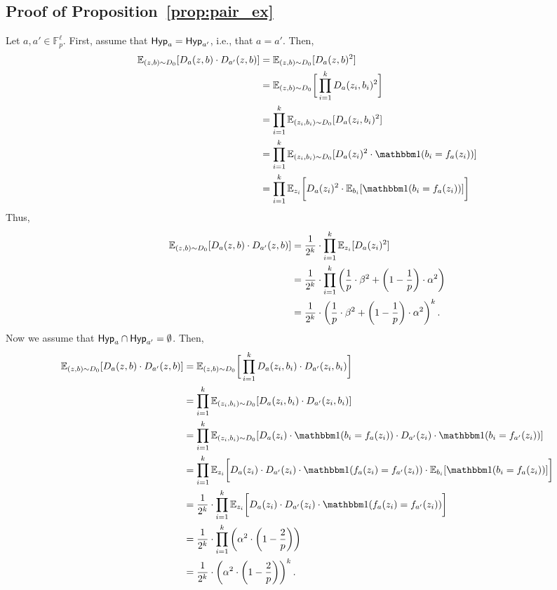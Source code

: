 \subsection{Proof of Proposition~\ref{prop:pair_ex}}

	Let $a, a' \in \mathbb{F}_p^{\ell}$. First, assume that $\mathsf{Hyp}_a = \mathsf{Hyp}_{a'}$, i.e., that $a = a'$. Then,
	\begin{align*}
	\Ex_{(z,b) \sim D_0}[D_a(z,b) \cdot D_{a'}(z,b)] &= \Ex_{(z,b) \sim D_0}[D_a(z,b)^2]\\
	&= \Ex_{(z,b) \sim D_0}\bigg[\displaystyle\prod\limits_{i = 1}^k D_a(z_i,b_i)^2 \bigg]\\
	&= \displaystyle\prod\limits_{i = 1}^k \Ex_{(z_i,b_i) \sim D_0} [D_a(z_i,b_i)^2]\\
	&= \displaystyle\prod\limits_{i = 1}^k \Ex_{(z_i,b_i) \sim D_0} [D_a(z_i)^2 \cdot \ind(b_i = f_a(z_i))]\\
	&= \displaystyle\prod\limits_{i = 1}^k \Ex_{z_i}\bigg[D_a(z_i)^2 \cdot \Ex_{b_i}[\ind(b_i = f_a(z_i))] \bigg]
	\end{align*}
	Thus,
	\begin{align*}
	\mathbb E_{(z,b) \sim D_0}[D_a(z,b) \cdot D_{a'}(z,b)] &= \frac{1}{2^k} \cdot \displaystyle\prod\limits_{i = 1}^k \mathbb E_{z_i}[D_a(z_i)^2]\\
	&= \frac{1}{2^k} \cdot \displaystyle\prod\limits_{i = 1}^k \left(\frac{1}{p} \cdot \beta^2 + \left(1-\frac{1}{p}\right) \cdot \alpha^2\right)\\
	&= \frac{1}{2^k} \cdot \left(\frac{1}{p} \cdot \beta^2 + \left(1-\frac{1}{p}\right) \cdot \alpha^2\right)^k.
	\end{align*}
	Now we assume that $\mathsf{Hyp}_a \cap \mathsf{Hyp}_{a'} = \emptyset$. Then,
	\begin{align*}
	\Ex_{(z,b) \sim D_0}[D_a(z,b) \cdot D_{a'}(z,b)] &= \Ex_{(z,b) \sim D_0}\bigg[\displaystyle\prod\limits_{i = 1}^k D_a(z_i,b_i) \cdot D_{a'}(z_i,b_i) \bigg]\\
	&= \displaystyle\prod\limits_{i = 1}^k \Ex_{(z_i,b_i) \sim D_0}[D_a(z_i,b_i) \cdot D_{a'}(z_i,b_i)]\\
	&= \displaystyle\prod\limits_{i = 1}^k \Ex_{(z_i,b_i) \sim D_0}[D_a(z_i) \cdot \ind(b_i = f_a(z_i)) \cdot D_{a'}(z_i) \cdot \ind(b_i = f_{a'}(z_i))]\\
	&=  \displaystyle\prod\limits_{i = 1}^k \Ex_{z_i}\bigg[D_a(z_i) \cdot D_{a'}(z_i) \cdot \ind(f_a(z_i) = f_{a'}(z_i))  \cdot \Ex_{b_i}[\ind(b_i = f_{a}(z_i))] \bigg]\\
	&=  \frac{1}{2^k} \cdot \displaystyle\prod\limits_{i = 1}^k \Ex_{z_i}\bigg[D_a(z_i) \cdot D_{a'}(z_i) \cdot \ind(f_a(z_i) = f_{a'}(z_i)) \bigg]\\
	&= \frac{1}{2^k} \cdot \displaystyle\prod\limits_{i = 1}^k \left(\alpha^2 \cdot \left(1-\frac{2}{p}\right)\right)\\
	&= \frac{1}{2^k}\cdot \left(\alpha^2 \cdot \left(1-\frac{2}{p}\right)\right)^k
	.\end{align*}
